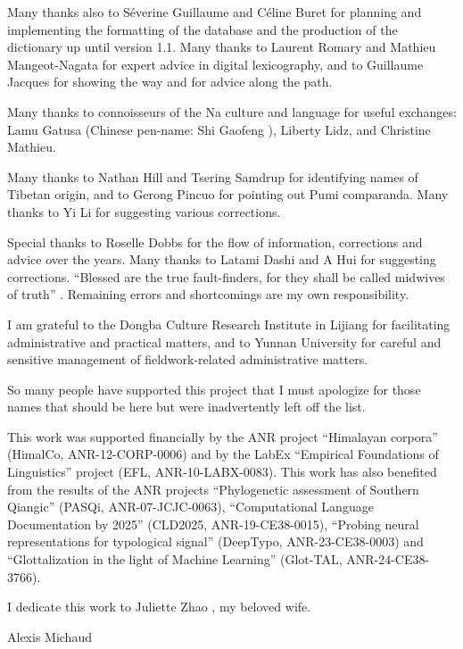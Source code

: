 Many thanks also to Séverine Guillaume and Céline Buret for planning and implementing the formatting of the database and the production of the dictionary up until version 1.1. Many thanks to Laurent Romary and Mathieu Mangeot-Nagata for expert advice in digital lexicography, and to Guillaume Jacques for showing the way and for advice along the path.

Many thanks to connoisseurs of the Na culture and language for useful exchanges: Lamu Gatusa  (Chinese pen-name: Shi Gaofeng ), Liberty Lidz, and Christine Mathieu.

Many thanks to Nathan Hill and Tsering Samdrup for identifying names of Tibetan origin, and to Gerong Pincuo  for pointing out Pumi comparanda. Many thanks to Yi Li  for suggesting various corrections.

Special thanks to Roselle Dobbs for the flow of information, corrections and advice over the years. Many thanks to Latami Dashi  and A Hui  for suggesting corrections. ``Blessed are the true fault-finders, for they shall be called midwives of truth'' \parencite[vi]{yliniemi_descriptive_2022}. Remaining errors and shortcomings are my own responsibility.

I am grateful to the Dongba Culture Research Institute  in Lijiang for facilitating administrative and practical matters, and to Yunnan University for careful and sensitive management of fieldwork-related administrative matters.

So many people have supported this project that I must apologize for those names that should be here but were inadvertently left off the list.

This work was supported financially by the ANR project  “Himalayan corpora” (HimalCo, ANR-12-CORP-0006) and by the LabEx “Empirical Foundations of Linguistics” project (EFL, ANR-10-LABX-0083). This work has also benefited from the results of the ANR projects “Phylogenetic assessment of Southern Qiangic” (PASQi, ANR-07-JCJC-0063), “Computational Language Documentation by 2025” (CLD2025, ANR-19-CE38-0015), “Probing neural representations for typological signal” (DeepTypo, ANR-23-CE38-0003) and “Glottalization in the light of Machine Learning” (Glot-TAL, ANR-24-CE38-3766).

I dedicate this work to Juliette Zhao , my beloved wife.

{\raggedleft Alexis Michaud\par}
